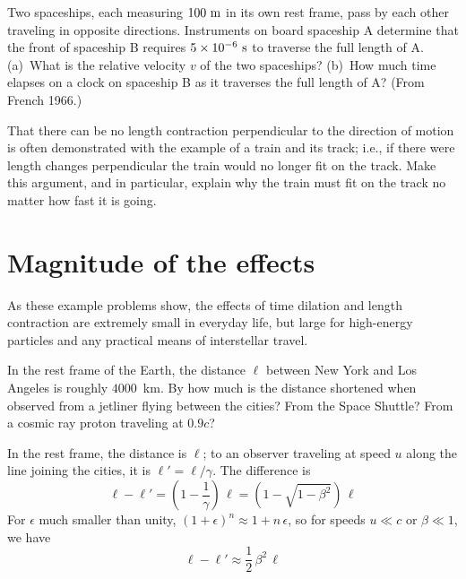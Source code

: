 \begin{problem}
Two spaceships, each measuring $100~{\rm m}$ in its own rest frame,
pass by each other traveling in opposite directions.  Instruments on
board spaceship A determine that the front of spaceship B requires
$5\times10^{-6}~{\rm s}$ to traverse the full length of A.  (a)~What
is the relative velocity $v$ of the two spaceships?  (b)~How much time
elapses on a clock on spaceship B as it traverses the full length of
A?  (From French 1966.)
\end{problem}

\begin{problem}
That there can be no length contraction perpendicular to the direction
of motion is often demonstrated with the example of a train and its
track; i.e., if there were length changes perpendicular the train
would no longer fit on the track.  Make this argument, and in
particular, explain why the train must fit on the track no matter how
fast it is going.
\end{problem}


\section{Magnitude of the effects}
\label{sec:mageff}

As these example problems show, the effects of time dilation and
length contraction are extremely small in everyday life, but large
for high-energy particles and any practical means of interstellar
travel.

\begin{problem}
In the rest frame of the Earth, the distance $\ell$ between New York
and Los Angeles is roughly $4000$~km.  By how much is the distance
shortened when observed from a jetliner flying between the cities?
From the Space Shuttle?  From a cosmic ray proton traveling at $0.9c$?
\end{problem}

In the rest frame, the distance is $\ell$; to an observer traveling at
speed $u$ along the line joining the cities, it is
$\ell'=\ell/\gamma$.  The difference is
\begin{equation}
\ell-\ell' = \left(1-\frac{1}{\gamma}\right)\,\ell
     = \left(1-\sqrt{1-\beta^2}\right)\,\ell
\end{equation}
For $\epsilon$ much smaller than unity, $(1+\epsilon)^n\approx
1+n\,\epsilon$, so for speeds $u\ll c$ or $\beta\ll 1$, we have
\begin{equation}
\ell-\ell'\approx \frac{1}{2}\,\beta^2\,\ell
\end{equation}

